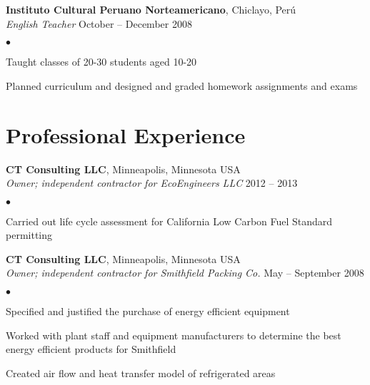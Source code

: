 \documentclass[margin,line,10pt]{res}
\newenvironment{list2}{
  \begin{list}{$\bullet$}{%
      \setlength{\itemsep}{0in}
      \setlength{\parsep}{0in} \setlength{\parskip}{0in}
      \setlength{\topsep}{0in} \setlength{\partopsep}{0in} 
      \setlength{\leftmargin}{0.2in}}}{\end{list}}
\begin{document}
\begin{resume}
\vspace*{-.1in}

{\bf Instituto Cultural Peruano Norteamericano}, Chiclayo, Per\'{u}\\
\vspace{-.3cm}
{\em English Teacher} \hfill October -- December 2008\\
\begin{list2}
\item Taught classes of 20-30 students aged 10-20
\item Planned curriculum and designed and graded homework assignments and exams
\end{list2}


\section{\sc Professional Experience}

{\bf CT Consulting LLC}, Minneapolis, Minnesota USA\\
\vspace{-.3cm}
{\em Owner; independent contractor for EcoEngineers LLC} \hfill 2012 -- 2013\\
\begin{list2}
\item Carried out life cycle assessment for California Low Carbon Fuel Standard permitting
\end{list2}

\vspace*{-.1in}

{\bf CT Consulting LLC}, Minneapolis, Minnesota USA\\
\vspace{-.3cm}
{\em Owner; independent contractor for Smithfield Packing Co.} \hfill May -- September 2008\\
\begin{list2}
\item Specified and justified the purchase of energy efficient equipment
\item Worked with plant staff and equipment manufacturers to determine the best energy efficient  products for Smithfield
\item Created air flow and heat transfer model of refrigerated areas
\end{list2}

\vspace*{-.1in}


\end{resume}
\end{document}
